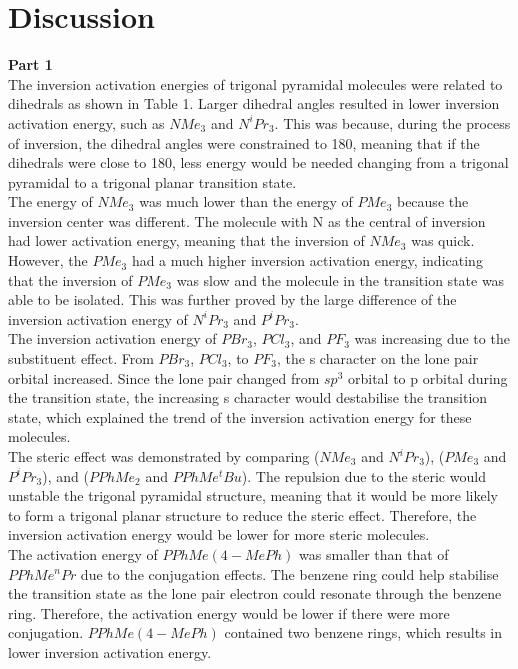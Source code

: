\documentclass[twocolumn]{article} %
\begin{document}
\section{Discussion}
\textbf{Part 1}
\\[1\baselineskip]
The inversion activation energies of trigonal pyramidal molecules were related to dihedrals as shown in Table 1. Larger dihedral angles resulted in lower inversion activation energy, such as $NMe_3$ and $N^iPr_3$. This was because, during the process of inversion, the dihedral angles were constrained to 180\textdegree, meaning that if the dihedrals were close to 180\textdegree, less energy would be needed changing from a trigonal pyramidal to a trigonal planar transition state.\\[1\baselineskip]

The energy of $NMe_3$ was much lower than the energy of $PMe_3$ because the inversion center was different. The molecule with N as the central of inversion had lower activation energy, meaning that the inversion of $NMe_3$ was quick. However, the $PMe_3$ had a much higher inversion activation energy, indicating that the inversion of $PMe_3$ was slow and the molecule in the transition state was able to be isolated. This was further proved by the large difference of the inversion activation energy of $N^iPr_3$ and $P^iPr_3$. \\[1\baselineskip]

The inversion activation energy of $PBr_3$, $PCl_3$, and $PF_3$ was increasing due to the substituent effect. From $PBr_3$, $PCl_3$, to $PF_3$, the s character on the lone pair orbital increased. Since the lone pair changed from $sp^3$ orbital to p orbital during the transition state, the increasing s character would destabilise the transition state, which explained the trend of the inversion activation energy for these molecules. \\[1\baselineskip]

The steric effect was demonstrated by comparing ($NMe_3$ and $N^iPr_3$), ($PMe_3$ and $P^iPr_3$), and ($PPhMe_2$ and $PPhMe^tBu$). The repulsion due to the steric would unstable the trigonal pyramidal structure, meaning that it would be more likely to form a trigonal planar structure to reduce the steric effect. Therefore, the inversion activation energy would be lower for more steric molecules. \\[1\baselineskip]

The activation energy of $PPhMe(4-MePh)$  was smaller than that of $PPhMe^nPr$ due to the conjugation effects. The benzene ring could help stabilise the transition state as the lone pair electron could resonate through the benzene ring. Therefore, the activation energy would be lower if there were more conjugation. $PPhMe(4-MePh)$ contained two benzene rings, which results in lower inversion activation energy. \\[1\baselineskip]
\end{document}
